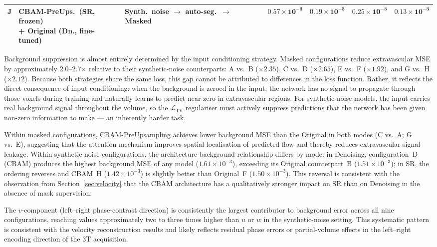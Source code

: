 \documentclass[11pt]{article}
\begin{document}
\begin{table}[!htbp]
\begin{tabular}{cll l rrrr}
    J & \makecell[l]{CBAM-PreUps.\ (SR, frozen)\\+ Original (Dn., fine-tuned)} & \makecell[l]{Synth.\ noise $\to$\\auto-seg.\ $\to$ Masked} & & $\mathbf{0.57{\times}10^{-3}}$ & $\mathbf{0.19{\times}10^{-3}}$ & $\mathbf{0.25{\times}10^{-3}}$ & $\mathbf{0.13{\times}10^{-3}}$ \\
    \bottomrule
  \end{tabular}
\end{table}

Background suppression is almost entirely determined by the input conditioning strategy.  Masked
configurations reduce extravascular MSE by approximately 2.0--2.7$\times$ relative to their
synthetic-noise counterparts: A vs.\ B ($\times 2.35$), C vs.\ D ($\times 2.65$), E vs.\ F
($\times 1.92$), and G vs.\ H ($\times 2.12$).  Because both strategies share the same loss,
this gap cannot be attributed to differences in the loss function.  Rather, it reflects the
direct consequence of input conditioning: when the background is zeroed in the input, the
network has no signal to propagate through those voxels during training and naturally learns to
predict near-zero in extravascular regions.  For synthetic-noise models, the input carries real
background signal throughout the volume, so the $\mathcal{L}_\text{TV}$ regulariser must
actively suppress predictions that the network has been given non-zero information to make ---
an inherently harder task.

Within masked configurations, CBAM-PreUpsampling achieves lower background MSE than the Original
in both modes (C vs.\ A; G vs.\ E), suggesting that the attention mechanism improves spatial
localisation of predicted flow and thereby reduces extravascular signal leakage.  Within
synthetic-noise configurations, the architecture-background relationship differs by mode: in
Denoising, configuration~D (CBAM) produces the highest background MSE of any model
($1.61{\times}10^{-3}$), exceeding its Original counterpart~B ($1.51{\times}10^{-3}$); in SR,
the ordering reverses and CBAM~H ($1.42{\times}10^{-3}$) is slightly better than Original~F
($1.50{\times}10^{-3}$).  This reversal is consistent with the observation from
Section~\ref{sec:velocity} that the CBAM architecture has a qualitatively stronger impact on
SR than on Denoising in the absence of mask supervision.

The $v$-component (left--right phase-contrast direction) is consistently the largest contributor
to background error across all nine configurations, reaching values approximately two to three
times higher than $u$ or $w$ in the synthetic-noise setting.  This systematic pattern is
consistent with the velocity reconstruction results and likely reflects residual phase errors
or partial-volume effects in the left--right encoding direction of the 3T acquisition.
\end{document}
